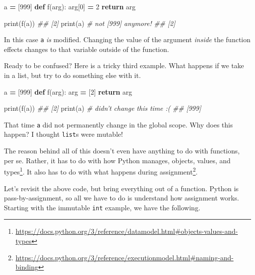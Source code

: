 \documentclass[12pt,krantz2]{krantz}
\makeatletter
\newenvironment{Shaded}{\begin{snugshade}}{\end{snugshade}}
\newcommand{\BuiltInTok}[1]{#1}
\newcommand{\CommentTok}[1]{\textcolor[rgb]{0.37,0.37,0.37}{\textit{#1}}}
\newcommand{\ControlFlowTok}[1]{\textcolor[rgb]{0.27,0.27,0.27}{\textbf{#1}}}
\newcommand{\DecValTok}[1]{\textcolor[rgb]{0.06,0.06,0.06}{#1}}
\newcommand{\KeywordTok}[1]{\textcolor[rgb]{0.27,0.27,0.27}{\textbf{#1}}}
\newcommand{\NormalTok}[1]{#1}
\newcommand{\OperatorTok}[1]{\textcolor[rgb]{0.43,0.43,0.43}{\textbf{#1}}}
\renewcommand{\href}[2]{#2\footnote{\url{#1}}}
\newenvironment{kframe}{%
\medskip{}
\setlength{\fboxsep}{.8em}
 \def\at@end@of@kframe{}%
 \ifinner\ifhmode%
  \def\at@end@of@kframe{\end{minipage}}%
  \begin{minipage}{\columnwidth}%
 \fi\fi%
 \def\FrameCommand##1{\hskip\@totalleftmargin \hskip-\fboxsep
 \colorbox{shadecolor}{##1}\hskip-\fboxsep
     \hskip-\linewidth \hskip-\@totalleftmargin \hskip\columnwidth}%
 \MakeFramed {\advance\hsize-\width
   \@totalleftmargin\z@ \linewidth\hsize
   \@setminipage}}%
 {\par\unskip\endMakeFramed%
 \at@end@of@kframe}
\renewenvironment{Shaded}{\begin{kframe}}{\end{kframe}}
\makeatother
\begin{document}
\begin{Shaded}
\begin{Highlighting}[]
\NormalTok{a }\OperatorTok{=}\NormalTok{ [}\DecValTok{999}\NormalTok{]}
\KeywordTok{def}\NormalTok{ f(arg):}
\NormalTok{    arg[}\DecValTok{0}\NormalTok{] }\OperatorTok{=} \DecValTok{2}
    \ControlFlowTok{return}\NormalTok{ arg}

\BuiltInTok{print}\NormalTok{(f(a))}
\CommentTok{## [2]}
\BuiltInTok{print}\NormalTok{(a) }\CommentTok{# not [999] anymore!}
\CommentTok{## [2]}
\end{Highlighting}
\end{Shaded}

In this case \texttt{a} \emph{is} modified. Changing the value of the argument \emph{inside} the function effects changes to that variable outside of the function.

Ready to be confused? Here is a tricky third example. What happens if we take in a list, but try to do something else with it.

\begin{Shaded}
\begin{Highlighting}[]
\NormalTok{a }\OperatorTok{=}\NormalTok{ [}\DecValTok{999}\NormalTok{]}
\KeywordTok{def}\NormalTok{ f(arg):}
\NormalTok{    arg }\OperatorTok{=}\NormalTok{ [}\DecValTok{2}\NormalTok{]}
    \ControlFlowTok{return}\NormalTok{ arg}

\BuiltInTok{print}\NormalTok{(f(a))}
\CommentTok{## [2]}
\BuiltInTok{print}\NormalTok{(a) }\CommentTok{# didn't change this time :(}
\CommentTok{## [999]}
\end{Highlighting}
\end{Shaded}

That time \texttt{a} did not permanently change in the global scope. Why does this happen? I thought \texttt{list}s were mutable!

The reason behind all of this doesn't even have anything to do with functions, per se. Rather, it has to do with how Python manages, \href{https://docs.python.org/3/reference/datamodel.html\#objects-values-and-types}{objects, values, and types}. It also has to do with what happens during \href{https://docs.python.org/3/reference/executionmodel.html\#naming-and-binding}{assignment}.

Let's revisit the above code, but bring everything out of a function. Python is pass-by-assignment, so all we have to do is understand how assignment works. Starting with the immutable \texttt{int} example, we have the following.
\end{document}
